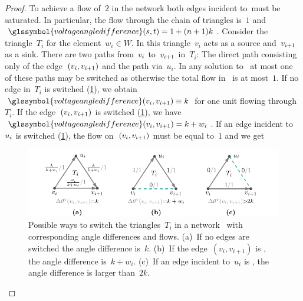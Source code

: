 \begin{proof}
 To achieve a flow of~$2$ in the network both edges incident to~\source must be
 saturated. In particular, the flow through the chain of triangles is~$1$
 and~$\glssymbol{voltageangledifference}(\source,\sink)=1+(n+1)k$. Consider the
 triangle~$T_i$ for the element~$w_i\in W$. In this triangle~$v_i$ acts as a
 source and~$v_{i+1}$ as a sink. There are two paths from~$v_i$
 to~$v_{i+1}$ in~$T_i$: The direct path consisting only of the
 edge~$(v_i,v_{i+1})$ and the path via~$u_i$. In any solution
 to~ at most one of these paths may be switched as otherwise
 the total flow in~ is at most~$1$. If no edge in~$T_i$ is
 switched
 (\cref{ch:switching:sec:complexity:fig:switching_triangles_hardness}),
 we obtain~$\glssymbol{voltageangledifference}(\vertex_i,\vertex_{i+1})\equiv k$
 for one unit flowing through~$T_i$. If the edge~$(v_i,v_{i+1})$ is
 switched
 (\cref{ch:switching:sec:complexity:fig:switching_triangles_hardness}),
 we have~$\glssymbol{voltageangledifference}( \vertex_i, \vertex_{i+1} ) = k +
 w_i$. If an edge incident to~$u_i$ is switched
 (\cref{ch:switching:sec:complexity:fig:switching_triangles_hardness}),
 the flow on~$(v_i,v_{i+1})$ must be equal to~$1$ and we get
% 
\begin{figure}[tb!]
    \centering
    \includegraphics[page=1,trim={0 0.5mm 0 0}, clip]
    {switchplacement/figures/switching_triangles_in_hardness_proof.pdf}
    \caption[Possible ways to switch in a triangle in a network constructed
    from~\gls{ssp}]{ Possible ways to switch the triangles~$T_i$ in a
    network~ with corresponding angle differences and flows.
    (a)~If no edges are switched the angle difference is~$k$. (b)~If the
    edge~$(v_i,v_{i+1})$ is , the angle
    difference is~$k+w_i$. (c)~If an edge incident to~$u_i$ is
    ,
    the angle difference is larger than~$2k$. }
    \label{ch:switching:sec:complexity:fig:switching_triangles_hardness}

\end{figure}
\end{proof}
